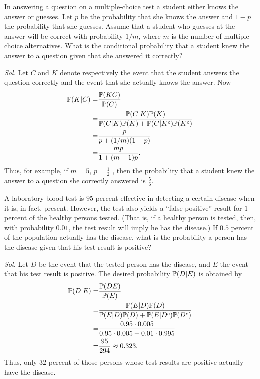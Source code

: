 \begin{example}
    In answering a question on a multiple-choice test a student either
    knows the answer or guesses. Let $p$ be the probability that she knows the answer and $1 − p$ the probability that she guesses. Assume that a student who guesses at the answer will be correct with probability $1/m$, where $m$ is the number of multiple-choice alternatives. What is the conditional probability that a student knew the answer to a question given that she answered it correctly?

    \textit{ Sol. } Let $C$ and $K$ denote respectively the event that the student answers the question correctly and the event that she actually knows the answer. Now 
    \begin{align*}
        \mathbb{P} (K | C) = & \frac{\mathbb{P}(KC)}{\mathbb{P}(C)} \\ 
        = & \frac{\mathbb{P} (C|K) \mathbb{P} (K)}{\mathbb{P} (C|K) \mathbb{P} (K) + \mathbb{P} (C|K^c) \mathbb{P} (K^c)} \\ 
        = & \frac{p}{p + (1/m)(1-p)} \\ 
        = & \frac{mp}{1 + (m-1)p}.
    \end{align*}
    Thus, for example, if $m = 5$, $p = \frac{1}{2}$ , then the probability that a student knew the answer to a question she correctly answered is $\frac{5}{6}$.
\end{example}

\begin{example}
    A laboratory blood test is $95$ percent effective in detecting a certain disease when it is, in fact, present. However, the test also yields a ``false positive'' result for $1$ percent of the healthy persons tested. (That is, if a healthy person is tested, then,
    with probability $0.01$, the test result will imply he has the disease.) If $0.5$ percent of the population actually has the disease, what is the probability a person has the disease
    given that his test result is positive?

    \textit{ Sol. } Let $D$ be the event that the tested person has the disease, and $E$ the event that his test result is positive. The desired probability $\mathbb{P} (D|E)$ is obtained by
    \begin{align*}
        \mathbb{P} (D | E) = & \frac{\mathbb{P} (DE)}{\mathbb{P} (E)} \\ 
        = & \frac{\mathbb{P} (E | D) \mathbb{P} (D)}{\mathbb{P} (E | D) \mathbb{P} (D) + \mathbb{P} (E | D^c) \mathbb{P} (D^c)} \\ 
        = & \frac{0.95 \cdot 0.005}{0.95 \cdot 0.005 + 0.01 \cdot 0.995} \\ 
        = & \frac{95}{294} \approx 0.323.
    \end{align*}
    Thus, only $32$ percent of those persons whose test results are positive actually have the disease.
\end{example}

